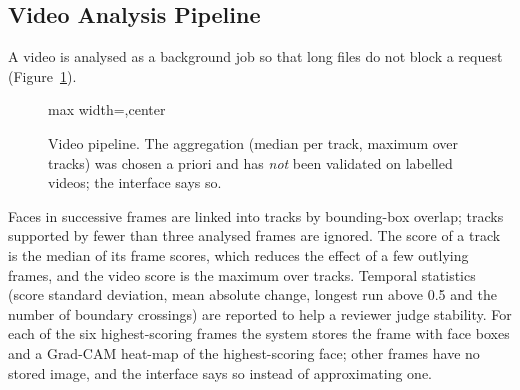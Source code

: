 \subsection{Video Analysis Pipeline}
A video is analysed as a background job so that long files do not block a request (Figure~\ref{fig:vidpipe}).

\begin{figure}[ht]
\centering
\begin{adjustbox}{max width=\linewidth,center}
\end{adjustbox}
\caption[Video pipeline. The aggregation (median per track, maximum over tracks) was chosen a priori]{Video pipeline. The aggregation (median per track, maximum over tracks) was chosen a priori and has \emph{not} been validated
on labelled videos; the interface says so.}
\label{fig:vidpipe}
\end{figure}
Faces in successive frames are linked into tracks by bounding-box overlap; tracks supported by fewer than three analysed frames are
ignored. The score of a track is the median of its frame scores, which reduces the effect of a few outlying frames, and the video score is
the maximum over tracks. Temporal statistics (score standard deviation, mean absolute change, longest run above 0.5 and the number of
boundary crossings) are reported to help a reviewer judge stability. For each of the six highest-scoring frames the system stores the frame
with face boxes and a Grad-CAM heat-map of the highest-scoring face; other frames have no stored image, and the interface says so instead of
approximating one.

